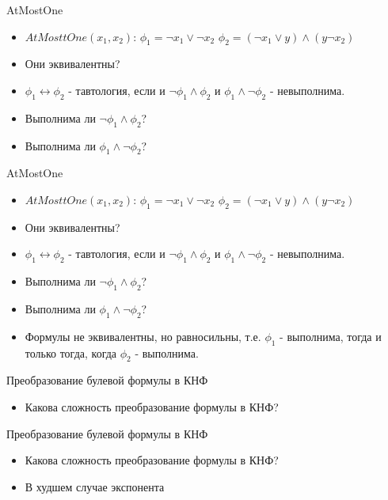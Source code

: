 \documentclass{beamer}
\begin{document}
\begin{frame}{AtMostOne}
\begin{itemize}
\item $AtMosttOne(x_1, x_2)$:\newline
$\phi_1 = \lnot x_1 \vee \lnot x_2$\newline
$\phi_2 = (\lnot x_1 \vee y) \wedge (y \lnot x_2)$\newline
\item Они эквивалентны?
\item $\phi_1 \leftrightarrow \phi_2$ - тавтология, если и $\lnot \phi_1 \wedge \phi_2$ и $\phi_1 \wedge \lnot \phi_2$ -
невыполнима.
\item Выполнима ли $\lnot \phi_1 \wedge \phi_2$?
\item Выполнима ли $\phi_1 \wedge \lnot \phi_2$?
\end{itemize}
\end{frame}

\begin{frame}{AtMostOne}
\begin{itemize}
\item $AtMosttOne(x_1, x_2)$:\newline
$\phi_1 = \lnot x_1 \vee \lnot x_2$\newline
$\phi_2 = (\lnot x_1 \vee y) \wedge (y \lnot x_2)$\newline
\item Они эквивалентны?
\item $\phi_1 \leftrightarrow \phi_2$ - тавтология, если и $\lnot \phi_1 \wedge \phi_2$ и $\phi_1 \wedge \lnot \phi_2$ -
невыполнима.
\item Выполнима ли $\lnot \phi_1 \wedge \phi_2$?
\item Выполнима ли $\phi_1 \wedge \lnot \phi_2$?
\item Формулы не эквивалентны, но равносильны, т.е. $\phi_1$ - выполнима, тогда и только тогда, когда $\phi_2$ - выполнима.
\end{itemize}
\end{frame}

\begin{frame}{Преобразование булевой формулы в КНФ}
\begin{itemize}
\item Какова сложность преобразование формулы в КНФ?
\end{itemize}
\end{frame}

\begin{frame}{Преобразование булевой формулы в КНФ}
\begin{itemize}
\item Какова сложность преобразование формулы в КНФ?
\item В худшем случае экспонента
\end{itemize}
\end{frame}
\end{document}
